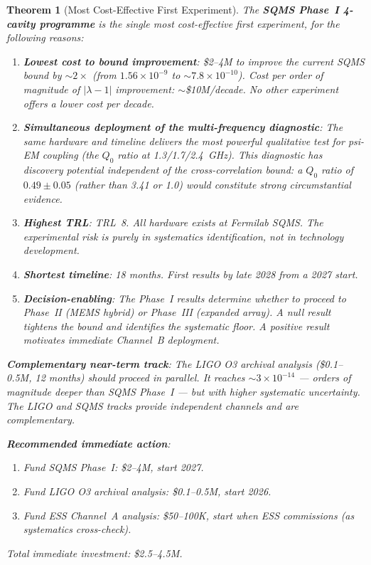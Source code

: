 \documentclass[11pt]{article}
\newcommand{\lam}{\lambda}
\newcommand{\ee}[1]{\times 10^{#1}}
\newcommand{\lbone}{|\lam - 1|}
\newtheorem{theorem}{Theorem}[section]
\theoremstyle{definition}
\theoremstyle{remark}
\begin{document}
\begin{theorem}[Most Cost-Effective First Experiment]
\label{thm:cost_effective}
The \textbf{SQMS Phase~I 4-cavity programme} is the single most
cost-effective first experiment, for the following reasons:

\begin{enumerate}
\item \textbf{Lowest cost to bound improvement}: \$2--4M to improve
  the current SQMS bound by $\sim 2\times$ (from $1.56\ee{-9}$ to
  $\sim 7.8\ee{-10}$). Cost per order of magnitude of $\lbone$
  improvement: $\sim$\$10M/decade. No other experiment offers a lower
  cost per decade.

\item \textbf{Simultaneous deployment of the multi-frequency
  diagnostic}: The same hardware and timeline delivers the most
  powerful qualitative test for psi-EM coupling (the $Q_0$ ratio
  at 1.3/1.7/2.4~GHz). This diagnostic has discovery potential
  independent of the cross-correlation bound: a $Q_0$ ratio of
  $0.49 \pm 0.05$ (rather than 3.41 or 1.0) would constitute
  strong circumstantial evidence.

\item \textbf{Highest TRL}: TRL~8. All hardware exists at Fermilab
  SQMS. The experimental risk is purely in systematics identification,
  not in technology development.

\item \textbf{Shortest timeline}: 18 months. First results by late
  2028 from a 2027 start.

\item \textbf{Decision-enabling}: The Phase~I results determine
  whether to proceed to Phase~II (MEMS hybrid) or Phase~III
  (expanded array). A null result tightens the bound and identifies
  the systematic floor. A positive result motivates immediate
  Channel~B deployment.
\end{enumerate}

\textbf{Complementary near-term track}: The LIGO O3 archival analysis
(\$0.1--0.5M, 12 months) should proceed in parallel. It reaches
$\sim 3\ee{-14}$ --- orders of magnitude deeper than SQMS Phase~I ---
but with higher systematic uncertainty. The LIGO and SQMS tracks
provide independent channels and are complementary.

\textbf{Recommended immediate action}:
\begin{enumerate}[nosep]
\item Fund SQMS Phase~I: \$2--4M, start 2027.
\item Fund LIGO O3 archival analysis: \$0.1--0.5M, start 2026.
\item Fund ESS Channel~A analysis: \$50--100K, start when ESS
  commissions (as systematics cross-check).
\end{enumerate}
Total immediate investment: \$2.5--4.5M.
\end{theorem}
\end{document}
